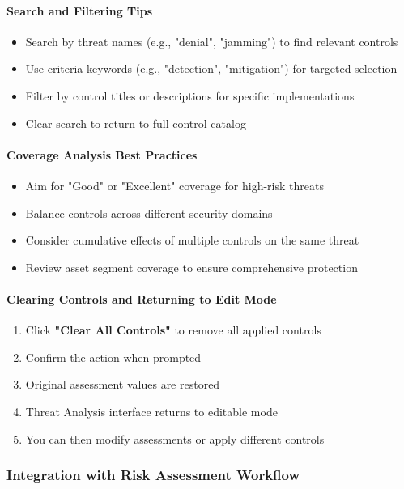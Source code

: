 \documentclass[binding=0.6cm]{sapthesis}
\begin{document}
\paragraph{Search and Filtering Tips}
\begin{itemize}
    \item Search by threat names (e.g., "denial", "jamming") to find relevant controls
    \item Use criteria keywords (e.g., "detection", "mitigation") for targeted selection
    \item Filter by control titles or descriptions for specific implementations
    \item Clear search to return to full control catalog
\end{itemize}

\paragraph{Coverage Analysis Best Practices}
\begin{itemize}
    \item Aim for "Good" or "Excellent" coverage for high-risk threats
    \item Balance controls across different security domains
    \item Consider cumulative effects of multiple controls on the same threat
    \item Review asset segment coverage to ensure comprehensive protection
\end{itemize}

\paragraph{Clearing Controls and Returning to Edit Mode}
\begin{enumerate}
    \item Click \textbf{"Clear All Controls"} to remove all applied controls
    \item Confirm the action when prompted
    \item Original assessment values are restored
    \item Threat Analysis interface returns to editable mode
    \item You can then modify assessments or apply different controls
\end{enumerate}

\subsubsection{Integration with Risk Assessment Workflow}
\end{document}
